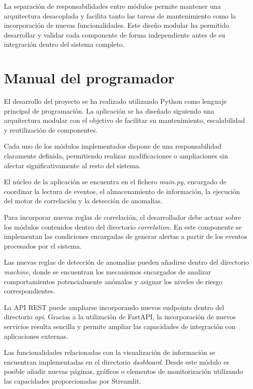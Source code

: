 La separación de responsabilidades entre módulos permite mantener una arquitectura desacoplada y facilita tanto las tareas de mantenimiento como la incorporación de nuevas funcionalidades. Este diseño modular ha permitido desarrollar y validar cada componente de forma independiente antes de su integración dentro del sistema completo.

\section{Manual del programador}

El desarrollo del proyecto se ha realizado utilizando Python como lenguaje principal de programación. La aplicación se ha diseñado siguiendo una arquitectura modular con el objetivo de facilitar su mantenimiento, escalabilidad y reutilización de componentes.

Cada uno de los módulos implementados dispone de una responsabilidad claramente definida, permitiendo realizar modificaciones o ampliaciones sin afectar significativamente al resto del sistema.

El núcleo de la aplicación se encuentra en el fichero \textit{main.py}, encargado de coordinar la lectura de eventos, el almacenamiento de información, la ejecución del motor de correlación y la detección de anomalías.

Para incorporar nuevas reglas de correlación, el desarrollador debe actuar sobre los módulos contenidos dentro del directorio \textit{correlation}. En este componente se implementan las condiciones encargadas de generar alertas a partir de los eventos procesados por el sistema.

Las nuevas reglas de detección de anomalías pueden añadirse dentro del directorio \textit{machine}, donde se encuentran los mecanismos encargados de analizar comportamientos potencialmente anómalos y asignar los niveles de riesgo correspondientes.

La API REST puede ampliarse incorporando nuevos endpoints dentro del directorio \textit{api}. Gracias a la utilización de FastAPI, la incorporación de nuevos servicios resulta sencilla y permite ampliar las capacidades de integración con aplicaciones externas.

Las funcionalidades relacionadas con la visualización de información se encuentran implementadas en el directorio \textit{dashboard}. Desde este módulo es posible añadir nuevas páginas, gráficos o elementos de monitorización utilizando las capacidades proporcionadas por Streamlit.

